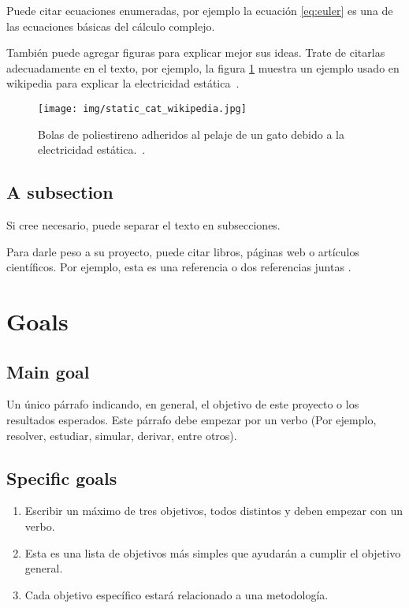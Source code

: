 \documentclass[demo, MAIN.tex]{subfiles}
\begin{document}
Puede citar ecuaciones enumeradas, por ejemplo la ecuación
\eqref{eq:euler} es una de las ecuaciones básicas del cálculo
complejo.

También puede agregar figuras para explicar mejor sus ideas. Trate de
citarlas adecuadamente en el texto, por ejemplo, la figura
\ref{fig:figura-interesante} muestra un ejemplo usado en wikipedia
para explicar la electricidad estática~\cite{wikistatic}.

\begin{figure}[h!]
  \centering
  \texttt{[image: img/static\_cat\_wikipedia.jpg]}
  \caption{Bolas de poliestireno adheridos al pelaje de un gato debido
    a la electricidad estática.~\cite{wikistatic}.}
  \label{fig:figura-interesante}
\end{figure}

\subsection{A subsection}

Si cree necesario, puede separar el texto en subsecciones.

Para darle peso a su proyecto, puede citar libros, páginas web o artículos científicos. Por ejemplo, esta es una referencia 
\cite{AF:2003} o dos referencias juntas \cite{AF:2003, CEL:arXiv, MS}.

\section{Goals}

\subsection{Main goal}

Un único párrafo indicando, en general, el objetivo de este proyecto o
los resultados esperados. Este párrafo debe empezar por un verbo (Por
ejemplo, resolver, estudiar, simular, derivar, entre otros).

\subsection{Specific goals}
\begin{enumerate}
\item Escribir un máximo de tres objetivos, todos distintos y deben empezar con un verbo.
\item Esta es una lista de objetivos más simples que ayudarán a cumplir el objetivo general.
\item Cada objetivo específico estará relacionado a una metodología.
\end{enumerate}
\end{document}
